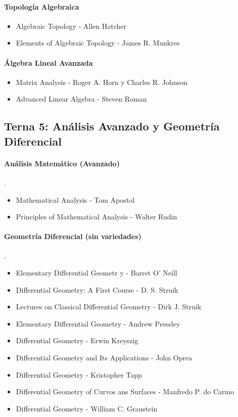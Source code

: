 \documentclass{article}
\begin{document}
\paragraph{Topolog\'ia Algebraica}
\begin{itemize}
	\item Algebraic Topology - Allen Hatcher
	\item Elements of Algebraic Topology - James R. Munkres
\end{itemize}
\paragraph{\'Algebra Lineal Avanzada}
\begin{itemize}
	\item Matrix Analysis - Roger A. Horn y Charles R. Johnson
	\item Advanced Linear Algebra - Steven Roman
\end{itemize}
\subsection*{Terna 5: An\'alisis Avanzado y Geometr\'ia Diferencial}
\paragraph*{An\'alisis Matem\'atico (Avanzado)}.
\begin{itemize}
	\item Mathematical Analysis - Tom Apostol
	\item Principles of Mathematical Analysis - Walter Rudin
\end{itemize}
\paragraph*{Geometr\'ia Diferencial (sin variedades)}.
\begin{itemize}
	\item Elementary Differential Geometr y - Barret O' Neill
	\item Differential Geometry: A First Course - D. S. Struik
	\item Lectures on Classical Differential Geometry - Dirk J. Struik
	\item Elementary Differential Geometry - Andrew Pressley
	\item Differential Geometry - Erwin Kreyszig
	\item Differential Geometry and Its Applications - John Oprea
	\item Differential Geometry - Kristopher Tapp
	\item Differential Geometry of Curvos ans Surfaces - Manfredo P. do Carmo
	\item Differential Geometry - William C. Graustein
\end{itemize}
\end{document}
